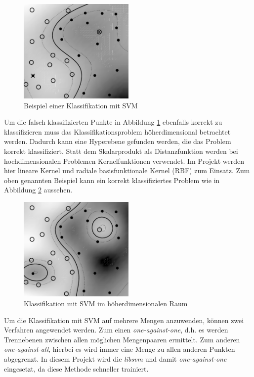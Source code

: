 \begin{figure}[h]
  \centering
  \includegraphics[width=0.50\textwidth]{images/svmA}
  \caption{Beispiel einer Klassifikation mit SVM \cite[S. 217]{bib:svmA}}
  \label{fig:svmA}
\end{figure}

Um die falsch klassifizierten Punkte in Abbildung \ref{fig:svmA} ebenfalls korrekt zu klassifizieren muss das Klassifikationsproblem höherdimensional betrachtet werden. Dadurch kann eine Hyperebene gefunden werden, die das Problem korrekt klassifiziert. Statt dem Skalarprodukt als Distanzfunktion werden bei hochdimensionalen Problemen Kernelfunktionen verwendet. Im Projekt werden hier lineare Kernel und radiale basisfunktionale Kernel (RBF) zum Einsatz. Zum oben genannten Beispiel kann ein korrekt klassifiziertes Problem wie in Abbildung \ref{fig:svmB} aussehen.

\begin{figure}[h]
  \centering
  \includegraphics[width=0.50\textwidth]{images/svmB}
  \caption{Klassifikation mit SVM im höherdimensionalen Raum \cite[S. 217]{bib:svmA}}
  \label{fig:svmB}
\end{figure}

Um die Klassifikation mit SVM auf mehrere Mengen anzuwenden, können zwei Verfahren angewendet werden. Zum einen \emph{one-against-one}, d.h. es werden Trennebenen zwischen allen möglichen Mengenpaaren ermittelt. Zum anderen \emph{one-against-all}, hierbei es wird immer eine Menge zu allen anderen Punkten abgegrenzt. In diesem Projekt wird die \emph{libsvm} und damit \emph{one-against-one} eingesetzt, da diese Methode schneller trainiert. \cite{bib:svmB}

